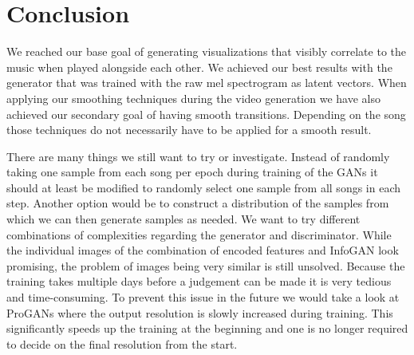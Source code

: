 \chapter{Conclusion}

    We reached our base goal of generating visualizations that visibly correlate to the music when played alongside each other. We achieved our best results with the generator that was trained with the raw mel spectrogram as latent vectors. When applying our smoothing techniques during the video generation we have also achieved our secondary goal of having smooth transitions. Depending on the song those techniques do not necessarily have to be applied for a smooth result.

    There are many things we still want to try or investigate. Instead of randomly taking one sample from each song per epoch during training of the GANs it should at least be modified to randomly select one sample from all songs in each step. Another option would be to construct a distribution of the samples from which we can then generate samples as needed. We want to try different combinations of complexities regarding the generator and discriminator. While the individual images of the combination of encoded features and InfoGAN look promising, the problem of images being very similar is still unsolved. Because the training takes multiple days before a judgement can be made it is very tedious and time-consuming. To prevent this issue in the future we would take a look at ProGANs where the output resolution is slowly increased during training. This significantly speeds up the training at the beginning and one is no longer required to decide on the final resolution from the start.